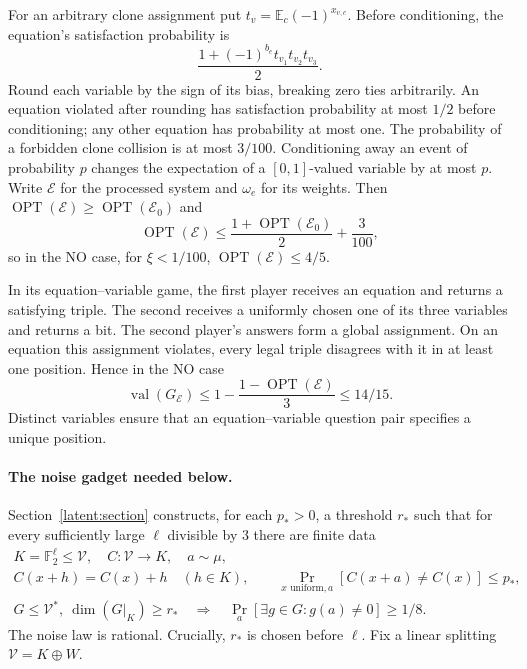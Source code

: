 \documentclass[11pt]{article}
\newcommand{\E}{\mathbb E}
\newcommand{\F}{\mathbb F}
\newcommand{\val}{\operatorname{val}}
\newcommand{\OPT}{\operatorname{OPT}}
\begin{document}
For an arbitrary clone assignment put $t_v=\E_c(-1)^{x_{v,c}}$. Before
conditioning, the equation's satisfaction probability is
\[
 \frac{1+(-1)^{b_e}t_{v_1}t_{v_2}t_{v_3}}2.
\]
Round each variable by the sign of its bias, breaking zero ties arbitrarily.
An equation violated after rounding has satisfaction probability at most
$1/2$ before conditioning; any other equation has probability at most one.
The probability of a forbidden clone collision is at most $3/100$.
Conditioning away an event of probability $p$ changes the expectation of
a $[0,1]$-valued variable by at most $p$. Write $\mathcal E$ for the
processed system and $\omega_e$ for its weights. Then
$\OPT(\mathcal E)\ge\OPT(\mathcal E_0)$ and
\[
 \OPT(\mathcal E)\le\frac{1+\OPT(\mathcal E_0)}2+\frac3{100},
\]
so in the NO case, for $\xi<1/100$, $\OPT(\mathcal E)\le4/5$.

In its equation--variable game, the first player receives an equation and
returns a satisfying triple. The second receives a uniformly chosen one
of its three variables and returns a bit. The second player's answers form
a global assignment. On an equation this assignment violates, every legal
triple disagrees with it in at least one position. Hence in the NO case
\begin{equation}\label{eq:base-gap}
 \val(G_{\mathcal E})\le1-\frac{1-\OPT(\mathcal E)}3\le14/15.
\end{equation}
Distinct variables ensure that an equation--variable question pair specifies
a unique position.

\paragraph{The noise gadget needed below.}
Section~\ref{latent:section} constructs, for each $p_*>0$, a threshold $r_*$
such that for every sufficiently large $\ell$ divisible by $3$ there are
finite data
\begin{equation}\label{eq:gadget-contract}
 \begin{gathered}
 K=\F_2^\ell\le\mathcal V,\quad C:\mathcal V\to K,\quad a\sim\mu,\\
 C(x+h)=C(x)+h\quad(h\in K),\qquad
 \Pr_{x\text{ uniform},a}[C(x+a)\ne C(x)]\le p_*,\\
 G\le\mathcal V^*,\ \dim(G|_K)\ge r_*
 \quad\Longrightarrow\quad
 \Pr_a[\exists g\in G:g(a)\ne0]\ge1/8.
 \end{gathered}
\end{equation}
The noise law is rational. Crucially, $r_*$ is chosen before $\ell$.
Fix a linear splitting $\mathcal V=K\oplus W$.
\end{document}
